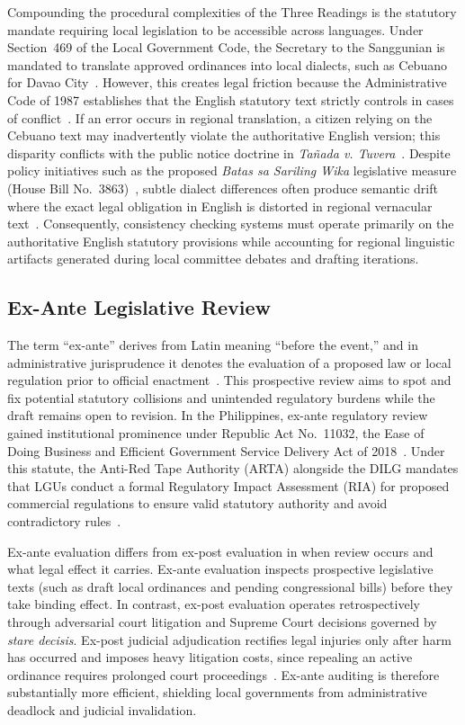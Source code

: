     Compounding the procedural complexities of the Three Readings is the statutory mandate requiring local legislation to be accessible across languages. Under Section~469 of the Local Government Code, the Secretary to the Sanggunian is mandated to translate approved ordinances into local dialects, such as Cebuano for Davao City~\cite{philgov1991ra7160, spdc2022ra00122, dreisbach2021language}. However, this creates legal friction because the Administrative Code of 1987 establishes that the English statutory text strictly controls in cases of conflict~\cite{philgov1987eo292}. If an error occurs in regional translation, a citizen relying on the Cebuano text may inadvertently violate the authoritative English version; this disparity conflicts with the public notice doctrine in \textit{Tañada v. Tuvera}~\cite{sc1985tanadavtuvera}. Despite policy initiatives such as the proposed \textit{Batas sa Sariling Wika} legislative measure (House Bill No.~3863)~\cite{reganit2025diokno}, subtle dialect differences often produce semantic drift where the exact legal obligation in English is distorted in regional vernacular text~\cite{maxilom2008semantic}. Consequently, consistency checking systems must operate primarily on the authoritative English statutory provisions while accounting for regional linguistic artifacts generated during local committee debates and drafting iterations.

    \subsection{Ex-Ante Legislative Review}
    The term ``ex-ante'' derives from Latin meaning ``before the event,'' and in administrative jurisprudence it denotes the evaluation of a proposed law or local regulation prior to official enactment~\cite{fried2015exanteexpost}. This prospective review aims to spot and fix potential statutory collisions and unintended regulatory burdens while the draft remains open to revision. In the Philippines, ex-ante regulatory review gained institutional prominence under Republic Act No.~11032, the Ease of Doing Business and Efficient Government Service Delivery Act of 2018~\cite{philippines2018ra11032}. Under this statute, the Anti-Red Tape Authority (ARTA) alongside the DILG mandates that LGUs conduct a formal Regulatory Impact Assessment (RIA) for proposed commercial regulations to ensure valid statutory authority and avoid contradictory rules~\cite{philippines2018ra11032}.

    Ex-ante evaluation differs from ex-post evaluation in when review occurs and what legal effect it carries. Ex-ante evaluation inspects prospective legislative texts (such as draft local ordinances and pending congressional bills) before they take binding effect. In contrast, ex-post evaluation operates retrospectively through adversarial court litigation and Supreme Court decisions governed by \textit{stare decisis}. Ex-post judicial adjudication rectifies legal injuries only after harm has occurred and imposes heavy litigation costs, since repealing an active ordinance requires prolonged court proceedings~\cite{gesteletal2011exanteevaluation}. Ex-ante auditing is therefore substantially more efficient, shielding local governments from administrative deadlock and judicial invalidation.

